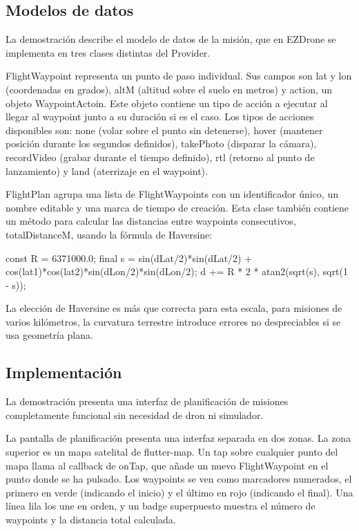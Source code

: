 \subsection{Modelos de datos}
La demostración describe el modelo de datos de la misión, que en EZDrone se implementa en tres clases distintas del Provider.

FlightWaypoint representa un punto de paso individual. Sus campos son lat y lon (coordenadas en grados), altM (altitud sobre el suelo en metros) y action, un objeto WaypointActoin. Este objeto contiene un tipo de acción a ejecutar al llegar al waypoint junto a su duración si es el caso. Los tipos de acciones disponibles son: none (volar sobre el punto sin detenerse), hover (mantener posición durante los segundos definidos), takePhoto (disparar la cámara), recordVideo (grabar durante el tiempo definido), rtl (retorno al punto de lanzamiento) y land (aterrizaje en el waypoint).

FlightPlan agrupa una lista de FlightWaypoints con un identificador único, un nombre editable y una marca de tiempo de creación. Esta clase también contiene un método para calcular las distancias entre waypoints consecutivos, totalDistanceM, usando la fórmula de Haversine: 

const R = 6371000.0;
final s = sin(dLat/2)*sin(dLat/2) + cos(lat1)*cos(lat2)*sin(dLon/2)*sin(dLon/2);
d += R * 2 * atan2(sqrt(s), sqrt(1 - s));

La elección de Haversine es más que correcta para esta escala, para misiones de varios kilómetros, la curvatura terrestre introduce errores no despreciables si se usa geometría plana.

\subsection{Implementación}
La demostración presenta una interfaz de planificación de misiones completamente funcional sin necesidad de dron ni simulador. 

La pantalla de planificación presenta una interfaz separada en dos zonas. La zona superior es un mapa satelital de flutter-map. Un tap sobre cualquier punto del mapa llama al callback de onTap, que añade un nuevo FlightWaypoint en el punto donde se ha pulsado. Los waypoints se ven como marcadores numerados, el primero en verde (indicando el inicio) y el último en rojo (indicando el final). Una línea lila los une en orden, y un badge superpuesto muestra el número de waypoints y la distancia total calculada.

